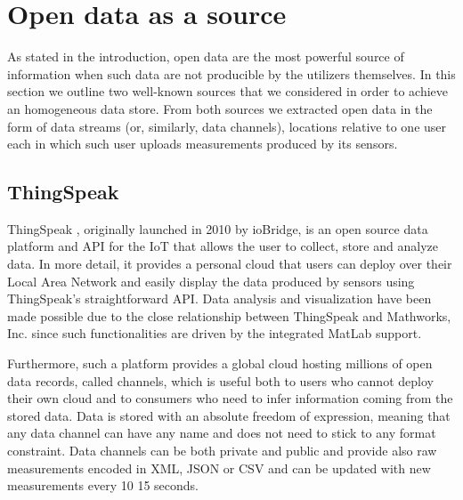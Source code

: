 \section{Open data as a source}
\label{sec:open}

As stated in the introduction, open data are the most powerful source of information when such data are not producible by the utilizers themselves.
In this section we outline two well-known sources that we considered in order to achieve an homogeneous data store.
From both sources we extracted open data in the form of data streams (or, similarly, data channels), locations relative to one user each in which such user uploads measurements produced by its sensors.

\subsection{ThingSpeak}
ThingSpeak \cite{thingspeak}, originally launched in 2010 by ioBridge, is an open source data platform and API for the IoT that allows the user to collect, store and analyze data.
In more detail, it provides a personal cloud that users can deploy over their Local Area Network and easily display the data produced by sensors using ThingSpeak's straightforward API.
Data analysis and visualization have been made possible due to the close relationship between ThingSpeak and Mathworks, Inc. since such functionalities are driven by the integrated MatLab support. 

Furthermore, such a platform provides a global cloud hosting millions of open data records, called channels, which is useful both to users who cannot deploy their own cloud and to consumers who need to infer information coming from the stored data.
Data is stored with an absolute freedom of expression, meaning that any data channel can have any name and does not need to stick to any format constraint.
Data channels can be both private and public and provide also raw measurements encoded in XML, JSON or CSV and can be updated with new measurements every \color{red}10\color{black} 15 seconds.

